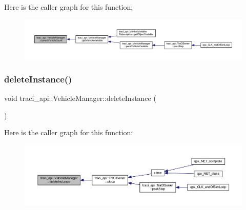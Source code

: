 Here is the caller graph for this function\+:
\nopagebreak
\begin{figure}[H]
\begin{center}
\leavevmode
\includegraphics[width=350pt]{classtraci__api_1_1_vehicle_manager_a97816bd56b6f2e6949d175de86c712d6_icgraph}
\end{center}
\end{figure}
\mbox{\label{classtraci__api_1_1_vehicle_manager_ac1ff1be2d47078aae68f6ed9ef5ff187}} 
\subsubsection{\texorpdfstring{delete\+Instance()}{deleteInstance()}}
{\footnotesize\ttfamily void traci\+\_\+api\+::\+Vehicle\+Manager\+::delete\+Instance (\begin{DoxyParamCaption}{ }\end{DoxyParamCaption})\hspace{0.3cm}{\ttfamily [static]}}

Here is the caller graph for this function\+:
\nopagebreak
\begin{figure}[H]
\begin{center}
\leavevmode
\includegraphics[width=350pt]{classtraci__api_1_1_vehicle_manager_ac1ff1be2d47078aae68f6ed9ef5ff187_icgraph}
\end{center}
\end{figure}
\mbox{\label{classtraci__api_1_1_vehicle_manager_a46fe50f2be4e9eb6df8f62b9a6e7aa53}} 
